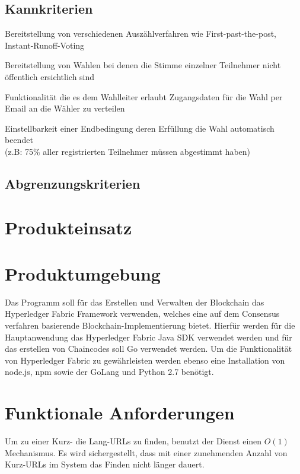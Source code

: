 \documentclass[parskip=full,11pt,twoside]{scrartcl}
\begin{document}
\subsection{Kannkriterien}

Bereitstellung von verschiedenen Auszählverfahren wie First-past-the-post, Instant-Runoff-Voting

Bereitstellung von Wahlen bei denen die Stimme einzelner Teilnehmer nicht öffentlich ersichtlich sind

Funktionalität die es dem Wahlleiter erlaubt Zugangsdaten für die Wahl per Email an die Wähler zu verteilen

Einstellbarkeit einer Endbedingung deren Erfüllung die Wahl automatisch beendet \\(z.B: 75\% aller registrierten Teilnehmer müssen abgestimmt haben)

\subsection{Abgrenzungskriterien}

\section{Produkteinsatz}

\section{Produktumgebung}
Das Programm soll für das Erstellen und Verwalten der Blockchain das Hyperledger Fabric Framework verwenden, welches eine auf dem Consensus verfahren basierende Blockchain-Implementierung bietet.
Hierfür werden für die Hauptanwendung das Hyperledger Fabric Java SDK verwendet werden und für  das erstellen von Chaincodes soll Go verwendet werden.
Um die Funktionalität von Hyperledger Fabric zu gewährleisten werden ebenso eine Installation von node.js, npm sowie der GoLang und Python 2.7 benötigt.

\section{Funktionale Anforderungen}

Um zu einer Kurz- die Lang-URLs zu finden,
benutzt der Dienst einen $O(1)$ Mechanismus.
Es wird sichergestellt,
dass mit einer zunehmenden Anzahl von Kurz-URLs im System
das Finden nicht länger dauert.
\end{document}
